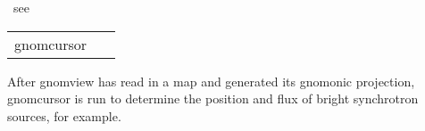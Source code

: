 \begin{related}
\hbox{\hspace{5cm}	see }
\end{related}


\begin{example}
{
\begin{tabular}{ll} %
gnomcursor & \ 
\end{tabular}
}
{After gnomview has read in a map and generated
its gnomonic projection, gnomcursor is run to determine the
position and flux of bright synchrotron sources, for example.}
\end{example}


